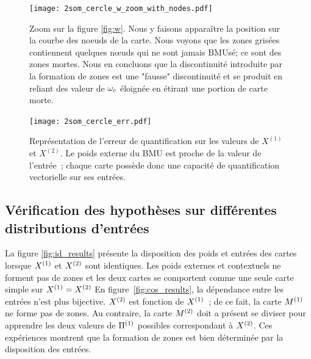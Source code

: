 \documentclass[../main]{subfiles}
\begin{document}
\begin{figure}
	\texttt{[image: 2som\_cercle\_w\_zoom\_with\_nodes.pdf]}
	\caption{Zoom sur la figure \ref{fig:w}. Nous y faisons apparaître la position sur la courbe des noeuds de la carte. Nous voyons que les zones grisées contiennent quelques n\oe{}uds qui ne sont jamais BMUsé; ce sont des zones mortes. Nous en concluons que la discontinuité introduite par la formation de zones est une "fausse" discontinuité et se produit en reliant des valeur de $\omega_c$ éloignée en étirant une portion de carte morte. \label{fig:w_zoom}}
\end{figure}

\begin{figure}
	\centering\texttt{[image: 2som\_cercle\_err.pdf]}
	\caption{Représentation de l'erreur de quantification sur les valeurs de $X^{(1)}$ et $X^{(2)}$. Le poids externe du BMU est proche de la valeur de l'entrée~; chaque carte possède donc une capacité de quantification vectorielle sur ses entrées. \label{fig:qv}}
\end{figure}


\subsection{Vérification des hypothèses sur différentes distributions d'entrées}

La figure \ref{fig:id_results} présente la disposition des poids et entrées des cartes lorsque $X^{({1})}$ et $X^{({2})}$ sont identiques. Les poids externes et contextuels ne forment pas de zones et les deux cartes se comportent comme une seule carte simple sur $X^{({1})} = X^{({2})}$
En figure~\ref{fig:cos_results}, la dépendance entre les entrées n'est plus bijective. $X^{({2})}$ est fonction de $X^{({1})}$~; de ce fait, la carte $M^{({1})}$ ne forme pas de zones. Au contraire, la carte $M^{({2})}$ doit a présent se diviser pour apprendre les deux valeurs de $\Pi^{({1})}$ possibles correspondant à $X^{({2})}$. Ces expériences montrent que la formation de zones est bien déterminée par la disposition des entrées.
\end{document}
